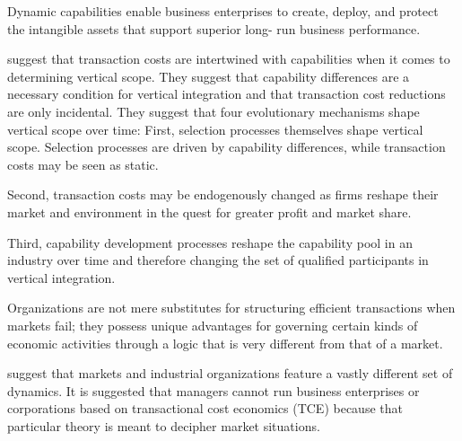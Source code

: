 \documentclass[12pt,letterpaper]{article}
\begin{document}
\cite{Teece2007} Dynamic capabilities enable business enterprises to create, deploy, and protect the intangible assets that support superior long- run business performance.

\cite{Jacobides2005a} suggest that transaction costs are intertwined with capabilities when it comes to determining vertical scope. They suggest that capability differences are a necessary condition for vertical integration and that transaction cost reductions are only incidental. They suggest that four evolutionary mechanisms shape vertical scope over time:
First, selection processes themselves shape vertical scope. Selection processes are driven by capability differences, while transaction costs may be seen as static.

Second, transaction costs may be endogenously changed as firms reshape their market and environment in the quest for greater profit and market share. 

Third, capability development processes reshape the capability pool in an industry over time and therefore changing the set of qualified participants in vertical integration. 

\cite{Ghoshal1996} Organizations are not mere substitutes for structuring efficient transactions when markets fail; they possess unique advantages for governing certain kinds of economic activities through a logic that is very different from that of a market.

\cite{Moran1996} suggest that markets and industrial organizations feature a vastly different set of dynamics. It is suggested that managers cannot run business enterprises or corporations based on transactional cost economics (TCE) because that particular theory is meant to decipher market situations.
\end{document}
